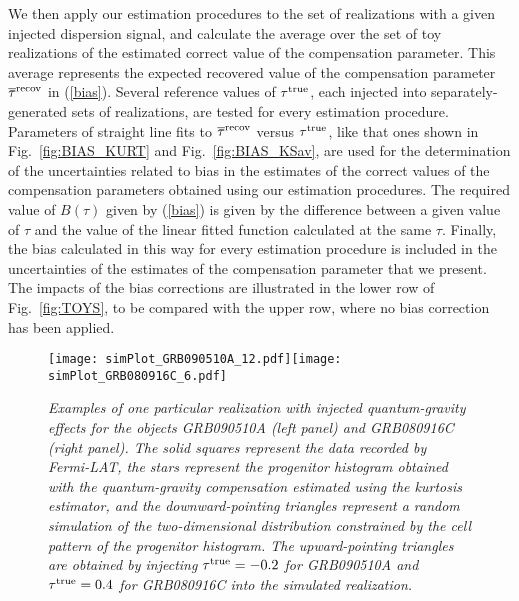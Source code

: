 \documentclass[12pt]{article}
\begin{document}
{We then apply our estimation procedures to the set of realizations with a given injected dispersion signal, and calculate the average
over the set of toy realizations of the estimated correct
value of the compensation parameter. This average represents the expected recovered value of the compensation
parameter $\overline\tau ^{\rm recov}$ in (\ref{bias}).
Several reference values of $\tau ^{\rm true}$, each injected into separately-generated sets of realizations,
are tested for every estimation procedure.
Parameters of straight line fits to $\overline\tau ^{\rm recov}$ versus $\tau ^{\rm true}$,
like that ones shown in Fig.~\ref{fig:BIAS_KURT} and Fig.~\ref{fig:BIAS_KSav}, are used for the determination
of the uncertainties related to bias in the estimates of the correct values of the compensation parameters obtained using
our estimation procedures. The required value of  $B(\tau )$ given by (\ref{bias}) is given
by the difference between a given value of $\tau $  and
the value of the linear fitted function calculated at the same $\tau $.
Finally, the bias calculated in this way for every estimation procedure is included in the uncertainties of the
estimates of the compensation parameter that we present. The impacts of the bias corrections are illustrated in
the lower row of Fig.~\ref{fig:TOYS}, to be compared with the upper row, where no bias correction has been applied.

\begin{figure}
\centering
\texttt{[image: simPlot\_GRB090510A\_12.pdf]}\hspace{0cm}\texttt{[image: simPlot\_GRB080916C\_6.pdf]}
\vspace{-0.4cm}
\caption{\it Examples of one particular realization with injected quantum-gravity effects for the
objects GRB090510A (left panel) and GRB080916C (right panel). The solid squares
represent the data recorded by {\it Fermi}-LAT, the stars represent the progenitor histogram obtained
with the quantum-gravity compensation estimated using the kurtosis estimator, and the downward-pointing triangles represent
a random simulation of the two-dimensional distribution constrained by the cell pattern of the
progenitor histogram. The upward-pointing triangles are obtained by injecting $\tau ^{\rm true}=-0.2$ for
GRB090510A and $\tau ^{\rm true}=0.4$ for GRB080916C into the simulated realization.}
\label{fig:BIAS_REALIZATIONS}
\end{figure}

}
\end{document}
